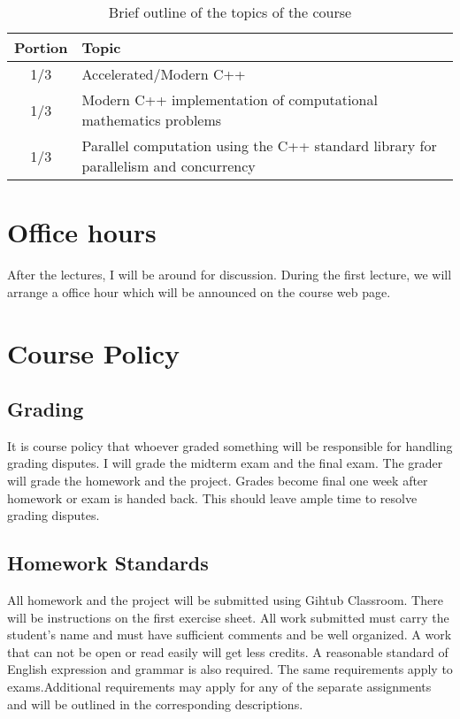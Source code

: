 \documentclass[11pt,letterpaper]{article}
\begin{document}
\begin{table}[tb]
\centering
\begin{tabular}{cl}
\hline
Portion & Topic \\
\hline
1/3 & Accelerated/Modern C++\\
1/3 & Modern C++ implementation of computational mathematics problems \\
1/3 & Parallel computation using the C++ standard library for parallelism and concurrency \\
\hline
\end{tabular}
\caption{Brief outline of the topics of the course}
\label{tab:outline}
\end{table}

\section*{Office hours}
After the lectures, I will be around for discussion. During the first lecture, we will arrange a office hour which will be announced on the course web page.

\section*{Course Policy}

\subsection*{Grading}
It is course policy that whoever graded something will be responsible for handling grading disputes. I will grade the midterm exam and the final exam. The grader will grade the homework and the project. Grades become final one week after homework or exam is handed back. This should leave ample time to resolve grading disputes.

\subsection*{Homework Standards}
All homework and the project will be submitted using Gihtub Classroom. There will be instructions on the first exercise sheet. All work submitted must carry the student's name and must have sufficient comments and be well organized. A work that can not be open or read easily will get less credits.  A  reasonable standard  of  English  expression  and  grammar  is  also  required.  The  same  requirements  apply  to  exams.Additional requirements   may   apply   for   any   of   the   separate   assignments   and   will   be   outlined   in   the   corresponding descriptions.
 
\end{document}
